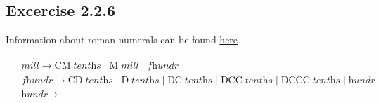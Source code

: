 \documentclass{article}
\begin{document}
\subsection*{Excercise 2.2.6}
Information about roman numerals can be found \href{https://en.wikipedia.org/wiki/Roman_numerals}{here}.

\begin{gather*}
    \begin{align*}
        &\textit{mill} \rightarrow \text{CM} \; \textit{tenths} \mid \text{M} \; \textit{mill} \mid \textit{fhundr} \\
        &\textit{fhundr} \rightarrow \text{CD} \; \textit{tenths}  \mid \text{D} \; \textit{tenths}  \mid \text{DC} \; \textit{tenths} \mid \text{DCC} \; \textit{tenths} \mid \text{DCCC} \; \textit{tenths} \mid \textit{hundr} \\
        &\textit{hundr} \rightarrow      
    \end{align*}
\end{gather*}
\end{document}
